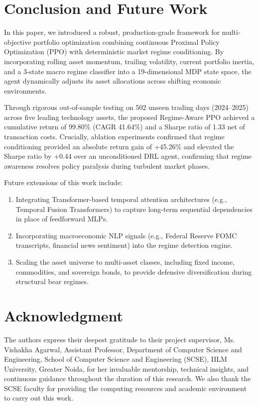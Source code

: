 \documentclass[conference]{IEEEtran}
\begin{document}
\section{Conclusion and Future Work}
In this paper, we introduced a robust, production-grade framework for multi-objective portfolio optimization combining continuous Proximal Policy Optimization (PPO) with deterministic market regime conditioning. By incorporating rolling asset momentum, trailing volatility, current portfolio inertia, and a 3-state macro regime classifier into a 19-dimensional MDP state space, the agent dynamically adjusts its asset allocations across shifting economic environments. 

Through rigorous out-of-sample testing on 502 unseen trading days (2024--2025) across five leading technology assets, the proposed Regime-Aware PPO achieved a cumulative return of 99.80\% (CAGR 41.64\%) and a Sharpe ratio of 1.33 net of transaction costs. Crucially, ablation experiments confirmed that regime conditioning provided an absolute return gain of +45.26\% and elevated the Sharpe ratio by +0.44 over an unconditioned DRL agent, confirming that regime awareness resolves policy paralysis during turbulent market phases.

Future extensions of this work include:
\begin{enumerate}
    \item Integrating Transformer-based temporal attention architectures (e.g., Temporal Fusion Transformers) to capture long-term sequential dependencies in place of feedforward MLPs.
    \item Incorporating macroeconomic NLP signals (e.g., Federal Reserve FOMC transcripts, financial news sentiment) into the regime detection engine.
    \item Scaling the asset universe to multi-asset classes, including fixed income, commodities, and sovereign bonds, to provide defensive diversification during structural bear regimes.
\end{enumerate}

\section*{Acknowledgment}
The authors express their deepest gratitude to their project supervisor, Ms. Vishakha Agarwal, Assistant Professor, Department of Computer Science and Engineering, School of Computer Science and Engineering (SCSE), IILM University, Greater Noida, for her invaluable mentorship, technical insights, and continuous guidance throughout the duration of this research. We also thank the SCSE faculty for providing the computing resources and academic environment to carry out this work.
\end{document}
